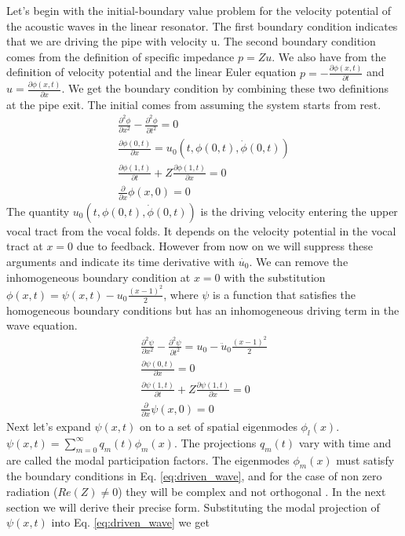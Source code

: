 \documentclass[superscriptaddress, onecolumn, prl]{revtex4}
\begin{document}
Let's begin with the initial-boundary value problem for the velocity potential of the acoustic waves in the linear resonator. The first boundary condition indicates that we are driving the pipe with velocity u. The second boundary condition comes from the definition of specific impedance $p=Zu$. We also have from the definition of velocity potential and the linear Euler equation $p=-\frac{\partial \phi (x,t)}{\partial t}$ and $ u = \frac{\partial \phi (x,t)}{\partial x}$. We get the boundary condition by combining these two definitions at the pipe exit. The initial comes from assuming the system starts from rest.
\begin{equation}
\label{eq:wave}
\begin{split}
\frac{\partial^2 \phi}{\partial x^2} - \frac{\partial^2 \phi}{\partial t^2} = 0 \\ 
\frac{\partial \phi (0,t)}{\partial x} = u_0 (t, \phi(0,t), \dot{\phi}(0,t)) \\ 
\frac{\partial \phi (1,t)}{\partial t} + Z \frac{\partial \phi (1,t)}{\partial x} = 0 \\
\frac{\partial}{\partial x} \phi(x,0)=0
\end{split}
\end{equation}
The quantity $u_0 (t, \phi(0,t), \dot{\phi}(0,t))$ is the driving velocity entering the upper vocal tract from the vocal folds. It depends on the velocity potential in the vocal tract at $x=0$ due to feedback. However from now on we will suppress these arguments and indicate its time derivative with $\dot{u_0}$. We can remove the inhomogeneous boundary condition at $x=0$ with the substitution $\phi(x,t)=\psi (x,t)-u_0 \frac{(x-1)^2}{2}$, where $\psi$ is a function that satisfies the homogeneous boundary conditions but has an inhomogeneous driving term in the wave equation.
\begin{equation}
\label{eq:driven_wave}
\begin{split}
\frac{\partial^2 \psi}{\partial x^2} - \frac{\partial^2 \psi}{\partial t^2} = u_0 - \ddot{u}_0 \frac{(x-1)^2}{2} \\ 
\frac{\partial \psi (0,t)}{\partial x} = 0 \\ 
\frac{\partial \psi (1,t)}{\partial t} + Z \frac{\partial \psi (1,t)}{\partial x} = 0 \\
\frac{\partial}{\partial x} \psi(x,0)=0
\end{split}
\end{equation} 
Next let's expand $\psi (x,t)$ on to a set of spatial eigenmodes $\phi_l (x)$. $\psi (x,t) = \sum_{m=0}^\infty q_m(t) \phi_m (x)$. The projections $q_m(t)$ vary with time and are called the modal participation factors. The eigenmodes $\phi_m (x)$ must satisfy the boundary conditions in Eq. \ref{eq:driven_wave}, and for the case of non zero radiation ($Re(Z) \neq 0$) they will be complex and not orthogonal . In the next section we will derive their precise form. Substituting the modal projection of $\psi (x,t)$ into Eq. \ref{eq:driven_wave} we get
\end{document}
